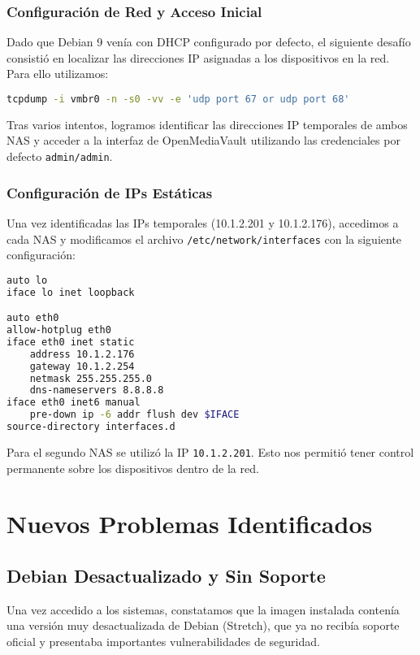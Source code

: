 \documentclass[12pt, a4paper]{article}
\begin{document}
\subsubsection{Configuración de Red y Acceso Inicial}
Dado que Debian 9 venía con DHCP configurado por defecto, el siguiente desafío consistió en localizar las direcciones IP asignadas a los dispositivos en la red. Para ello utilizamos:

\begin{lstlisting}[language=bash, caption=Comando para localizar dispositivos en red.]
tcpdump -i vmbr0 -n -s0 -vv -e 'udp port 67 or udp port 68'
\end{lstlisting}

Tras varios intentos, logramos identificar las direcciones IP temporales de ambos NAS y acceder a la interfaz de OpenMediaVault utilizando las credenciales por defecto \texttt{admin/admin}.

\subsubsection{Configuración de IPs Estáticas}
Una vez identificadas las IPs temporales (10.1.2.201 y 10.1.2.176), accedimos a cada NAS y modificamos el archivo \texttt{/etc/network/interfaces} con la siguiente configuración: \\

\begin{lstlisting}[language=bash, caption=Configuración de red estática para NAS 1.]
auto lo
iface lo inet loopback

auto eth0
allow-hotplug eth0
iface eth0 inet static
    address 10.1.2.176
    gateway 10.1.2.254
    netmask 255.255.255.0
    dns-nameservers 8.8.8.8
iface eth0 inet6 manual
    pre-down ip -6 addr flush dev $IFACE
source-directory interfaces.d
\end{lstlisting}

Para el segundo NAS se utilizó la IP \texttt{10.1.2.201}. Esto nos permitió tener control permanente sobre los dispositivos dentro de la red.

\section{Nuevos Problemas Identificados}

\subsection{Debian Desactualizado y Sin Soporte}
Una vez accedido a los sistemas, constatamos que la imagen instalada contenía una versión muy desactualizada de Debian (Stretch), que ya no recibía soporte oficial y presentaba importantes vulnerabilidades de seguridad.
\end{document}
